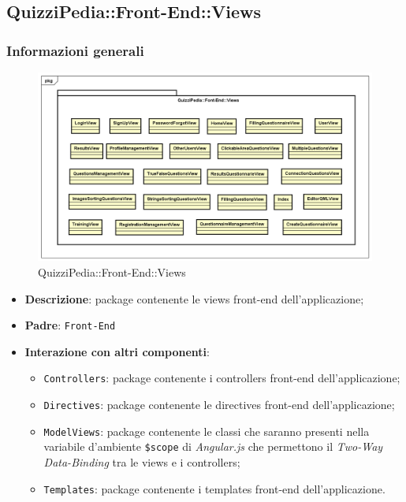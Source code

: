 \newpage

\subsection{QuizziPedia::Front-End::Views}
\subsubsection{Informazioni generali}
\label{QuizziPedia::Front-End::Views}
\begin{figure}
	\centering
	\includegraphics[scale=0.80]{UML/Package/QuizziPedia_Front-End_Views.png}
	\caption{QuizziPedia::Front-End::Views}
\end{figure}
\begin{itemize}
	\item \textbf{Descrizione}: package contenente le views front-end dell'applicazione;
	\item \textbf{Padre}: \texttt{Front-End}
	\item \textbf{Interazione con altri componenti}:
	\begin{itemize}
		\item \texttt{Controllers}: package contenente i controllers front-end dell'applicazione;
		\item \texttt{Directives}: package contenente le directives front-end dell'applicazione;
		\item \texttt{ModelViews}: package contenente le classi che saranno presenti nella variabile d'ambiente \texttt{\$scope} di \textit{Angular.js} che permettono il \textit{Two-Way Data-Binding} tra le views e i controllers;
		\item \texttt{Templates}: package contenente i templates front-end dell'applicazione.
	\end{itemize}
\end{itemize}
